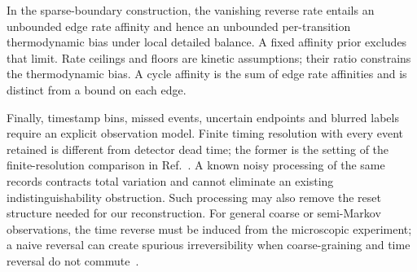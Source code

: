 \documentclass[aps,pre,onecolumn,11pt,longbibliography,notitlepage]{revtex4-2}
\newcommand{\1}{\mathbf 1}
\begin{document}
In the sparse-boundary construction, the vanishing reverse rate entails
an unbounded edge rate affinity and hence an unbounded per-transition
thermodynamic bias under local detailed balance. A fixed affinity prior
excludes that limit. Rate ceilings and floors are kinetic assumptions;
their ratio constrains the thermodynamic bias. A cycle affinity is the
sum of edge rate affinities and is distinct from a bound on each edge.

Finally, timestamp bins, missed events, uncertain endpoints and blurred
labels require an explicit observation model. Finite timing resolution
with every event retained is different from detector dead time; the
former is the setting of the finite-resolution comparison in
Ref.~\cite{FritzErtelSeifert2025}. A known noisy processing of the same
records contracts total variation and cannot eliminate an existing
indistinguishability obstruction. Such processing may also remove the
reset structure needed for our reconstruction. For general coarse or
semi-Markov observations, the time reverse must be induced from the
microscopic experiment; a naive reversal can create spurious
irreversibility when coarse-graining and time reversal do not
commute~\cite{Blom2024,BiskerReply2024}.
\end{document}
